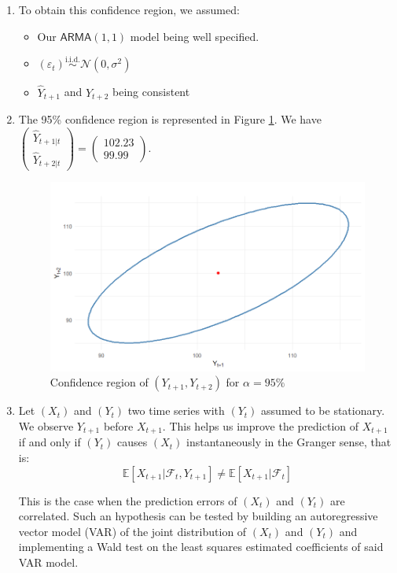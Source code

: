 \documentclass[12pt]{article}
\newcommand{\ARMA}{\textsf{ARMA}}
\newcommand{\iidsim}{\overset{\text{i.i.d.}}{\sim}}
\begin{document}
\begin{enumerate}
        \item To obtain this confidence region, we assumed:
        \begin{itemize}
            \item Our $\ARMA(1,1)$ model being well specified.
            \item $(\varepsilon_t) \iidsim \mathcal{N}(0, \sigma^2)$
            \item $\widehat{Y}_{t+1}$ and $\widehat{Y}_{t+2}$ being consistent
        \end{itemize}

        \item The 95\% confidence region is represented in Figure \ref{fig:confidence_region}. We have $\begin{pmatrix} \widehat{Y}_{t+1|t} \\ \widehat{Y}_{t+2|t}\end{pmatrix} = 
        \begin{pmatrix} 102.23 \\ 99.99\end{pmatrix}$.
        \begin{figure}[h]
            \centering
            \includegraphics[width=0.9\linewidth]{plot region.png}
            \caption{Confidence region of $(Y_{t+1},Y_{t+2})$ for $\alpha=95\%$}
            \label{fig:confidence_region}
        \end{figure}

        \item Let $(X_t)$ and $(Y_t)$ two time series with $(Y_t)$ assumed to be stationary. We observe $Y_{t+1}$ before $X_{t+1}$. This helps us improve the prediction of $X_{t+1}$ if and only if $(Y_t)$ causes $(X_t)$ instantaneously in the Granger sense, that is:
        \[\mathbb{E}[X_{t+1}|\mathcal{F}_t,Y_{t+1}] \neq \mathbb{E}[X_{t+1}|\mathcal{F}_t]\]

        This is the case when the prediction errors of $(X_t)$ and $(Y_t)$ are correlated. Such an hypothesis can be tested by building an autoregressive vector model (VAR) of the joint distribution of $(X_t)$ and $(Y_t)$ and implementing a Wald test on the least squares estimated coefficients of said VAR model.
        
    \end{enumerate}
\end{document}
